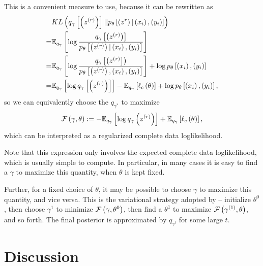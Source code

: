\documentclass{article}
\begin{document}
This is a convenient measure to use, because it can be rewritten as
\begin{align*}
&KL\left(q_{\gamma}\left[\left(z^{(r)}\right)\right] \vert \vert
p_{\theta}\left[\left(z^{r}\right) \vert \left(x_{i}\right), \left(y_{i}\right)\right]\right) \\
= &\mathbb{E}_{q_{\gamma}}\left[{\log\frac{q_{\gamma}\left[\left(z^{(r)}\right)\right]}{p_{\theta}\left[\left(z^{(r)}\right) \vert \left(x_{i}\right), \left(y_{i}\right)\right]}}\right] \\
= &\mathbb{E}_{q_{\gamma}}\left[{\log\frac{q_{\gamma}\left[\left(z^{(r)}\right]\right)}{p_{\theta}\left[\left(z^{(r)}\right), \left(x_{i}\right), \left(y_{i}\right)\right]}}\right] + \log p_{\theta}\left[\left(x_{i}\right), \left(y_{i}\right)\right] \\
= &\mathbb{E}_{q_{\gamma}}\left[{\log q_{\gamma}\left[\left(z^{(r)}\right)\right]}\right] - \mathbb{E}_{q_{\gamma}}\left[{\ell_{c}\left(\theta\right)}\right] + \log p_{\theta}\left[\left(x_{i}\right), \left(y_{i}\right)\right],
\end{align*}
so we can equivalently choose the $q_{\gamma^{\ast}}$ to maximize
\begin{align*}
\mathcal{F}\left(\gamma, \theta\right) := -\mathbb{E}_{q_{\gamma}}\left[{\log q_{\gamma}\left(z^{(r)}\right)}\right] + \mathbb{E}_{q_{\gamma}}\left[{\ell_{c}\left(\theta\right)}\right],
\end{align*}
which can be interpreted as a regularized complete data loglikelihood.

Note that this expression only involves the expected complete data
loglikelihood, which is usually simple to compute. In particular, in many cases
it is easy to find a $\gamma$ to maximize this quantity, when $\theta$ is kept
fixed.

Further, for a fixed choice of $\theta$, it may be possible to choose $\gamma$
to maximize this quantity, and vice versa. This is the variational  strategy
adopted by \citep{zhang2005learning} -- initialize $\theta^{0}$, then choose
$\gamma^{1}$ to minimize $\mathcal{F}\left(\gamma, \theta^{0}\right)$, then
find a $\theta^{1}$ to maximize $\mathcal{F}\left(\gamma^{(1)}, \theta\right)$, and
so forth. The final posterior is approximated by $q_{\gamma^{t}}$ for some
large $t$.

\section{Discussion}
\label{sec:Discussion}
\end{document}
